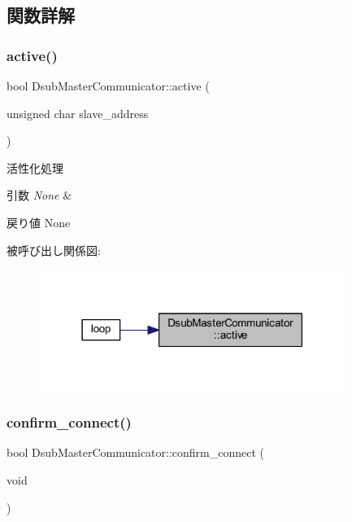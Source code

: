 \subsection{関数詳解}
\mbox{\label{class_dsub_master_communicator_a326013bfa0efeba26958317ce38706ac}} 
\subsubsection{\texorpdfstring{active()}{active()}}
{\footnotesize\ttfamily bool Dsub\+Master\+Communicator\+::active (\begin{DoxyParamCaption}\item[{unsigned char}]{slave\+\_\+address }\end{DoxyParamCaption})}



活性化処理 


\begin{DoxyParams}{引数}
{\em None} & \\
\hline
\end{DoxyParams}
\begin{DoxyReturn}{戻り値}
None 
\end{DoxyReturn}
被呼び出し関係図\+:\nopagebreak
\begin{figure}[H]
\begin{center}
\leavevmode
\includegraphics[width=283pt]{class_dsub_master_communicator_a326013bfa0efeba26958317ce38706ac_icgraph}
\end{center}
\end{figure}
\mbox{\label{class_dsub_master_communicator_acb3acb522c4ff0099044fe9451008864}} 
\subsubsection{\texorpdfstring{confirm\_connect()}{confirm\_connect()}}
{\footnotesize\ttfamily bool Dsub\+Master\+Communicator\+::confirm\+\_\+connect (\begin{DoxyParamCaption}\item[{void}]{ }\end{DoxyParamCaption})}



